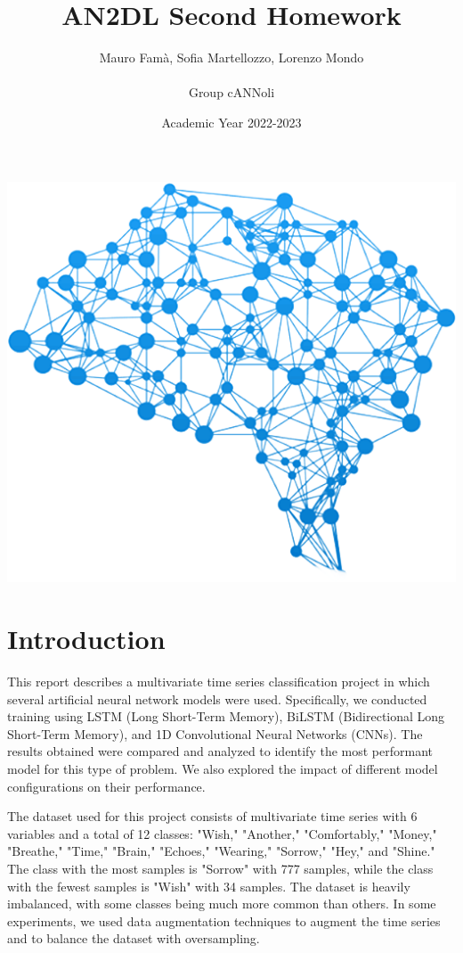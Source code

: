 \documentclass[11pt, oneside]{article}
\title{{\arial AN2DL Second Homework}}
\author{{\calibri Mauro Famà,   Sofia Martellozzo,   Lorenzo Mondo\\ \\
        Group cANNoli}}
\date{Academic Year 2022-2023}
\begin{document}
\maketitle
\begin{center}
    \includegraphics[scale=0.43]{images/title.png}
\end{center}
\newpage
\vspace{.25in}


\section{Introduction}
This report describes a multivariate time series classification project in which several artificial neural network models were used. Specifically, we conducted training using LSTM (Long Short-Term Memory), BiLSTM (Bidirectional Long Short-Term Memory), and 1D Convolutional Neural Networks (CNNs). The results obtained were compared and analyzed to identify the most performant model for this type of problem. We also explored the impact of different model configurations on their performance.

The dataset used for this project consists of multivariate time series with 6 variables and a total of 12 classes: "Wish," "Another," "Comfortably," "Money," "Breathe," "Time," "Brain," "Echoes," "Wearing," "Sorrow," "Hey," and "Shine." The class with the most samples is "Sorrow" with 777 samples, while the class with the fewest samples is "Wish" with 34 samples. The dataset is heavily imbalanced, with some classes being much more common than others. In some experiments, we used data augmentation techniques to augment the time series and to balance the dataset with oversampling.
\end{document}
